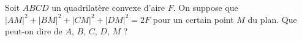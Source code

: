 Soit $ABCD$ un quadrilatère convexe d'aire $F$. On suppose que $|AM|^2 + |BM|^2 + |CM|^2 + |DM|^2 = 2F$ pour un certain point $M$ du plan. Que peut-on dire de $A$, $B$, $C$, $D$, $M$ ?
